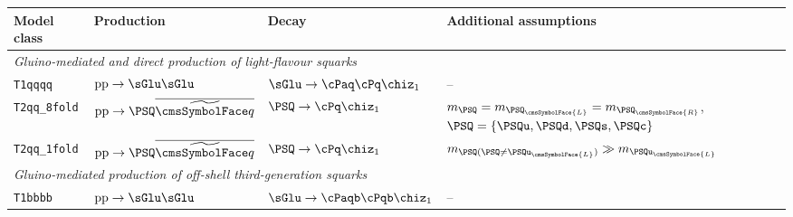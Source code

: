\begin{table}[!b]
  \label{tab:simplified-models}
  \centering
  \footnotesize
  \begin{tabular}{ llll }
    \hline
Model class               %
                                & Production
                                & Decay
                                & Additional assumptions                                                         \\ [0.5ex]
\hline
\multicolumn{4}{l}{\it Gluino-mediated and direct production of light-flavour squarks}                           \\ [0.5ex]
\texttt{T1qqqq}        %
                                & $\text{pp}\ra\sGlu\sGlu$
                                & $\sGlu\ra\cPaq\cPq\chiz_1$
                                & --                                                                             \\ [0.5ex]
\texttt{T2qq\_8fold}   %
                                & $\text{pp}\ra\PSQ\PASQ$        
                                & $\PSQ\ra\cPq\chiz_1$
                                & $m_{\PSQ} = m_{\PSQ_\cmsSymbolFace{L}} = m_{\PSQ_\cmsSymbolFace{R}}$,
                       $\PSQ = \{ \PSQu, \PSQd, \PSQs, \PSQc \}$                                                 \\ [0.5ex]
\texttt{T2qq\_1fold}   %
                                & $\text{pp}\ra\PSQ\PASQ$         
                                & $\PSQ\ra\cPq\chiz_1$
                                & $m_{\PSQ (\PSQ \neq \PSQu_\cmsSymbolFace{L})} \gg m_{\PSQu_\cmsSymbolFace{L}}$ \\ [0.5ex]
\multicolumn{4}{l}{\it Gluino-mediated production of off-shell third-generation squarks}                         \\ [0.5ex]
\texttt{T1bbbb}        %
                                & $\text{pp}\ra\sGlu\sGlu$       
                                & $\sGlu\ra\cPaqb\cPqb\chiz_1$
                                & --                                                                             \\ [0.5ex]

\end{tabular}
\end{table}
